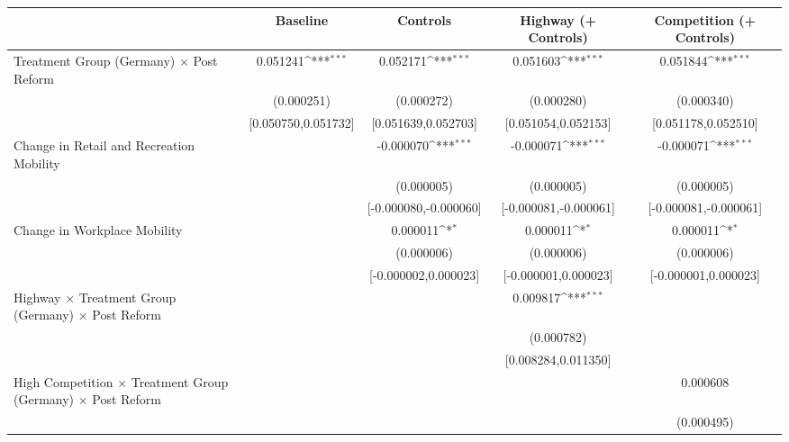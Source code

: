 {
\def\sym#1{\ifmmode^{#1}\else\(^{#1}\)\fi}
\begin{tabular}{l*{4}{c}}
\toprule
                    &\multicolumn{1}{c}{Baseline}&\multicolumn{1}{c}{Controls}&\multicolumn{1}{c}{Highway (+ Controls)}&\multicolumn{1}{c}{Competition (+ Controls)}\\
\midrule
Treatment Group (Germany) $\times$ Post Reform&    0.051241\sym{***}&    0.052171\sym{***}&    0.051603\sym{***}&    0.051844\sym{***}\\
                    &  (0.000251)         &  (0.000272)         &  (0.000280)         &  (0.000340)         \\
                    &[0.050750,0.051732]         &[0.051639,0.052703]         &[0.051054,0.052153]         &[0.051178,0.052510]         \\
Change in Retail and Recreation Mobility&                     &   -0.000070\sym{***}&   -0.000071\sym{***}&   -0.000071\sym{***}\\
                    &                     &  (0.000005)         &  (0.000005)         &  (0.000005)         \\
                    &                     &[-0.000080,-0.000060]         &[-0.000081,-0.000061]         &[-0.000081,-0.000061]         \\
Change in Workplace Mobility&                     &    0.000011\sym{*}  &    0.000011\sym{*}  &    0.000011\sym{*}  \\
                    &                     &  (0.000006)         &  (0.000006)         &  (0.000006)         \\
                    &                     &[-0.000002,0.000023]         &[-0.000001,0.000023]         &[-0.000001,0.000023]         \\
Highway $\times$ Treatment Group (Germany) $\times$ Post Reform&                     &                     &    0.009817\sym{***}&                     \\
                    &                     &                     &  (0.000782)         &                     \\
                    &                     &                     &[0.008284,0.011350]         &                     \\
High Competition $\times$ Treatment Group (Germany) $\times$ Post Reform&                     &                     &                     &    0.000608         \\
                    &                     &                     &                     &  (0.000495)         \\

\end{tabular}}
